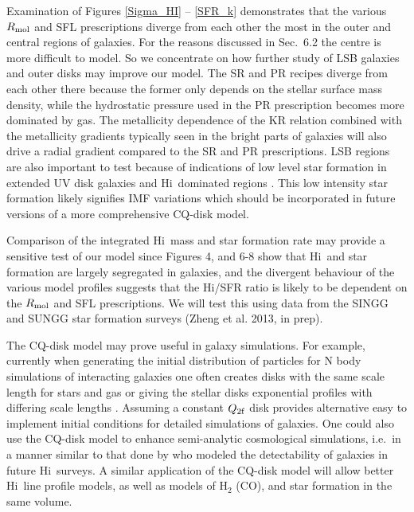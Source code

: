 \documentclass[12pt,preprint]{aastex}
\newcommand{\HI}{\mbox{\sc Hi}}
\begin{document}
Examination of Figures \ref{Sigma_HI} -- \ref{SFR_k} demonstrates that
the various $R_{\rm mol}$ and SFL prescriptions diverge from each other
the most in the outer and central regions of galaxies. For the reasons
discussed in Sec.~6.2 the centre is more difficult to model. So we
concentrate on how further study of LSB galaxies and outer disks may
improve our model. The SR and PR recipes diverge from each other there
because the former only depends on the stellar surface mass density, while the
hydrostatic pressure used in the PR prescription becomes more dominated
by gas. The metallicity dependence of the KR relation combined with the
metallicity gradients typically seen in the bright parts of galaxies
\citep{zkh94,kbg03,mou10} will also drive a radial gradient compared to
the SR and PR prescriptions. LSB regions are also important to test
because of indications of low level star formation in extended UV disk
galaxies \citep{thi05,thi07} and \HI\ dominated regions \citep{big10b}.
This low intensity star formation likely signifies IMF variations
\citep{meu09,lee09b,hel10,gun11} which should be incorporated in
future versions of a more comprehensive CQ-disk model.

Comparison of the integrated \HI\ mass and star formation rate may
provide a sensitive test of our model since Figures 4, and 6-8 show
that \HI\ and star formation are largely segregated in galaxies, and
the divergent behaviour of the various model profiles suggests that the
\HI/SFR ratio is likely to be dependent on the $R_{\rm mol}$ and SFL
prescriptions.  We will test this using data from the SINGG and SUNGG
star formation surveys (Zheng et al. 2013, in prep).  

The CQ-disk model may prove useful in galaxy simulations. For example,
currently when generating the initial distribution of particles for N body
simulations of interacting galaxies one often creates disks with the same
scale length for stars and gas \citep[e.g.][]{jnb09,bc11} or giving the
stellar disks exponential profiles with differing scale lengths
\citep[e.g.][]{ljcp08}. Assuming a constant $Q_{\rm 2f}$ disk provides
alternative easy to implement initial conditions for detailed
simulations of galaxies. One could also use the CQ-disk model to enhance
semi-analytic cosmological simulations, i.e.\ in a manner similar to
that done by \citep{duf12a,duf12b} who modeled the detectability of
galaxies in future \HI\ surveys. A similar application of the CQ-disk
model will allow better \HI\ line profile models, as well as models of
H$_2$ (CO), and star formation in the same volume.
\end{document}
